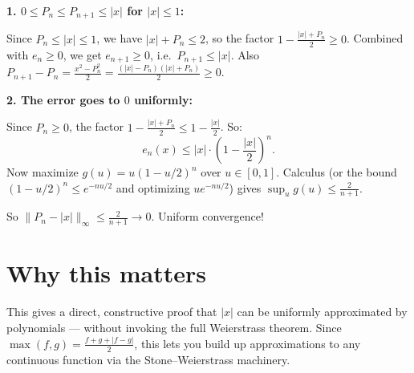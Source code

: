\documentclass[12pt]{article}
\begin{document}
\textbf{1. $0 \leq P_n \leq P_{n+1} \leq |x|$ for $|x| \leq 1$:}

Since $P_n \leq |x| \leq 1$, we have $|x| + P_n \leq 2$, so the factor $1 - \frac{|x|+P_n}{2} \geq 0$. Combined with $e_n \geq 0$, we get $e_{n+1} \geq 0$, i.e.\ $P_{n+1} \leq |x|$. Also $P_{n+1} - P_n = \frac{x^2 - P_n^2}{2} = \frac{(|x|-P_n)(|x|+P_n)}{2} \geq 0$.

\textbf{2. The error goes to $0$ uniformly:}

Since $P_n \geq 0$, the factor $1 - \frac{|x| + P_n}{2} \leq 1 - \frac{|x|}{2}$. So:
$$
e_n(x) \leq |x| \cdot \left(1 - \frac{|x|}{2}\right)^n.
$$
Now maximize $g(u) = u(1 - u/2)^n$ over $u \in [0,1]$. Calculus (or the bound $(1-u/2)^n \leq e^{-nu/2}$ and optimizing $ue^{-nu/2}$) gives $\sup_u g(u) \leq \frac{2}{n+1}$.

So $\|P_n - |x|\|_\infty \leq \frac{2}{n+1} \to 0$. Uniform convergence!

\section*{Why this matters}

This gives a direct, constructive proof that $|x|$ can be uniformly approximated by polynomials --- without invoking the full Weierstrass theorem. Since $\max(f,g) = \frac{f+g+|f-g|}{2}$, this lets you build up approximations to any continuous function via the Stone--Weierstrass machinery.
\end{document}
